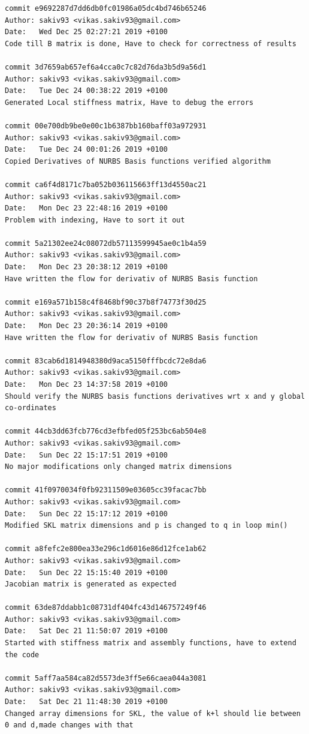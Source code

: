 \documentclass[11pt]{article}
\begin{document}
\begin{Verbatim}[breaklines=true]
commit e9692287d7dd6db0fc01986a05dc4bd746b65246
Author: sakiv93 <vikas.sakiv93@gmail.com>
Date:   Wed Dec 25 02:27:21 2019 +0100
Code till B matrix is done, Have to check for correctness of results

commit 3d7659ab657ef6a4cca0c7c82d76da3b5d9a56d1
Author: sakiv93 <vikas.sakiv93@gmail.com>
Date:   Tue Dec 24 00:38:22 2019 +0100
Generated Local stiffness matrix, Have to debug the errors

commit 00e700db9be0e00c1b6387bb160baff03a972931
Author: sakiv93 <vikas.sakiv93@gmail.com>
Date:   Tue Dec 24 00:01:26 2019 +0100
Copied Derivatives of NURBS Basis functions verified algorithm

commit ca6f4d8171c7ba052b036115663ff13d4550ac21
Author: sakiv93 <vikas.sakiv93@gmail.com>
Date:   Mon Dec 23 22:48:16 2019 +0100
Problem with indexing, Have to sort it out

commit 5a21302ee24c08072db57113599945ae0c1b4a59
Author: sakiv93 <vikas.sakiv93@gmail.com>
Date:   Mon Dec 23 20:38:12 2019 +0100
Have written the flow for derivativ of NURBS Basis function

commit e169a571b158c4f8468bf90c37b8f74773f30d25
Author: sakiv93 <vikas.sakiv93@gmail.com>
Date:   Mon Dec 23 20:36:14 2019 +0100
Have written the flow for derivativ of NURBS Basis function

commit 83cab6d1814948380d9aca5150fffbcdc72e8da6
Author: sakiv93 <vikas.sakiv93@gmail.com>
Date:   Mon Dec 23 14:37:58 2019 +0100
Should verify the NURBS basis functions derivatives wrt x and y global co-ordinates

commit 44cb3dd63fcb776cd3efbfed05f253bc6ab504e8
Author: sakiv93 <vikas.sakiv93@gmail.com>
Date:   Sun Dec 22 15:17:51 2019 +0100
No major modifications only changed matrix dimensions

commit 41f0970034f0fb92311509e03605cc39facac7bb
Author: sakiv93 <vikas.sakiv93@gmail.com>
Date:   Sun Dec 22 15:17:12 2019 +0100
Modified SKL matrix dimensions and p is changed to q in loop min()

commit a8fefc2e800ea33e296c1d6016e86d12fce1ab62
Author: sakiv93 <vikas.sakiv93@gmail.com>
Date:   Sun Dec 22 15:15:40 2019 +0100
Jacobian matrix is generated as expected

commit 63de87ddabb1c08731df404fc43d146757249f46
Author: sakiv93 <vikas.sakiv93@gmail.com>
Date:   Sat Dec 21 11:50:07 2019 +0100
Started with stiffness matrix and assembly functions, have to extend the code

commit 5aff7aa584ca82d5573de3ff5e66caea044a3081
Author: sakiv93 <vikas.sakiv93@gmail.com>
Date:   Sat Dec 21 11:48:30 2019 +0100
Changed array dimensions for SKL, the value of k+l should lie between 0 and d,made changes with that


\end{Verbatim}
\end{document}
